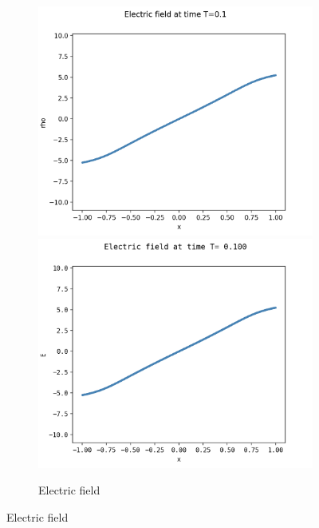 \documentclass{article}
\numberwithin{equation}{section}
\newcommand{\imh}{\textheight} %
\newcommand{\imw}{\textwidth} %
\begin{document}
\begin{figure}
	\centering
	\newcommand{\rootSL}{../code_SL/}
	\newcommand{\rootFD}{../temp_res_DF/}
	\newcommand{\dirSL}{run_comp_short_time_2sp_Nx1000_Nvi2001_Nve2001_Nt6250}
	\newcommand{\dirFD}{run_comp_short_time_2sp_Nx1000_Nv2000_Nt6250}
	
	\renewcommand{\imh}{0.24\textheight}
	\renewcommand{\imw}{0.45\linewidth}
	\begin{subfigure}{\textwidth}
		\centering
		\includegraphics[height=\imh,width=\imw]{images/ET0p1_FD.png}
		\includegraphics[height=\imh,width=\imw]{images/ET0p1.png}
		\caption{Electric field }
		\label{subfig:compT01_E}
	\end{subfigure}


\end{figure}
\end{document}
